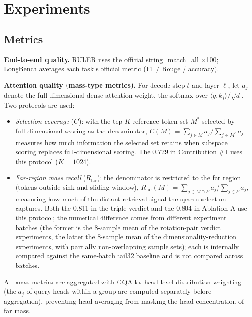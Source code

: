 \documentclass[11pt]{article}
\begin{document}
\section{Experiments}

\subsection{Metrics}

\textbf{End-to-end quality.} RULER uses the official string\_match\_all $\times$100; LongBench averages each task's official metric (F1 / Rouge / accuracy).

\textbf{Attention quality (mass-type metrics).} For decode step $t$ and layer $\ell$, let $a_j$ denote the full-dimensional dense attention weight, the softmax over $\langle q, k_j \rangle / \sqrt{d}$. Two protocols are used:
\begin{itemize}
\item \emph{Selection coverage} ($C$): with the top-$K$ reference token set $M^\ast$ selected by full-dimensional scoring as the denominator, $C(M) = \sum_{j \in M} a_j / \sum_{j \in M^\ast} a_j$ measures how much information the selected set retains when subspace scoring replaces full-dimensional scoring. The 0.729 in Contribution \#1 uses this protocol ($K{=}1024$).
\item \emph{Far-region mass recall} ($R_{\mathrm{far}}$): the denominator is restricted to the far region (tokens outside sink and sliding window), $R_{\mathrm{far}}(M) = \sum_{j \in M \cap F} a_j / \sum_{j \in F} a_j$, measuring how much of the distant retrieval signal the sparse selection captures. Both the 0.811 in the triple verdict and the 0.804 in Ablation A use this protocol; the numerical difference comes from different experiment batches (the former is the 8-sample mean of the rotation-pair verdict experiments, the latter the 8-sample mean of the dimensionality-reduction experiments, with partially non-overlapping sample sets); each is internally compared against the same-batch tail32 baseline and is not compared across batches.
\end{itemize}
All mass metrics are aggregated with GQA kv-head-level distribution weighting (the $a_j$ of query heads within a group are computed separately before aggregation), preventing head averaging from masking the head concentration of far mass.
\end{document}
